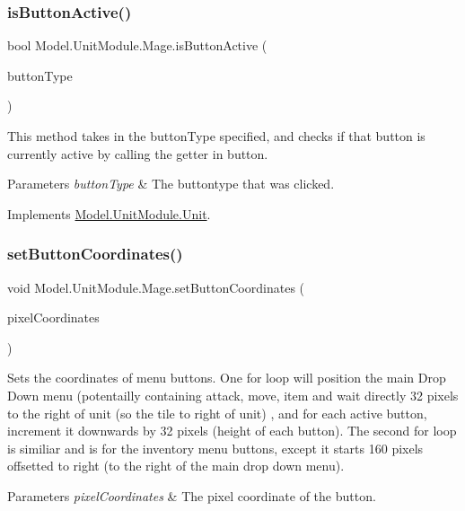 \subsubsection{\texorpdfstring{is\+Button\+Active()}{isButtonActive()}}
{\footnotesize\ttfamily bool Model.\+Unit\+Module.\+Mage.\+is\+Button\+Active (\begin{DoxyParamCaption}\item[{\hyperlink{namespace_model_ac76b3489c9d704f49912608bd36cd0e7}{Button\+Type}}]{button\+Type }\end{DoxyParamCaption})\hspace{0.3cm}{\ttfamily [inline]}}

This method takes in the button\+Type specified, and checks if that button is currently active by calling the getter in button. 
\begin{DoxyParams}{Parameters}
{\em button\+Type} & The buttontype that was clicked. \\
\hline
\end{DoxyParams}


Implements \hyperlink{interface_model_1_1_unit_module_1_1_unit_a3931ef1523507e7261411dc79ee4e4af}{Model.\+Unit\+Module.\+Unit}.

\hypertarget{class_model_1_1_unit_module_1_1_mage_a2cbdb537e8039e19367b2d9905847e1b}{}\label{class_model_1_1_unit_module_1_1_mage_a2cbdb537e8039e19367b2d9905847e1b} 
\subsubsection{\texorpdfstring{set\+Button\+Coordinates()}{setButtonCoordinates()}}
{\footnotesize\ttfamily void Model.\+Unit\+Module.\+Mage.\+set\+Button\+Coordinates (\begin{DoxyParamCaption}\item[{Vector2}]{pixel\+Coordinates }\end{DoxyParamCaption})\hspace{0.3cm}{\ttfamily [inline]}}

Sets the coordinates of menu buttons. One for loop will position the main Drop Down menu (potentailly containing attack, move, item and wait directly 32 pixels to the right of unit (so the tile to right of unit) , and for each active button, increment it downwards by 32 pixels (height of each button). The second for loop is similiar and is for the inventory menu buttons, except it starts 160 pixels offsetted to right (to the right of the main drop down menu). 
\begin{DoxyParams}{Parameters}
{\em pixel\+Coordinates} & The pixel coordinate of the button. \\
\hline
\end{DoxyParams}



